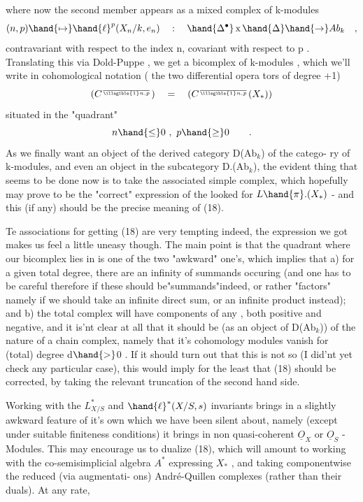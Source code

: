 
where now the second member appears as a mixed complex  of k-modules
\[ (n,p)\hand{\mapsto}\hand{\ell}^{p}(X_{n}/k,e_{n}) \quad : \quad \hand{\Delta^{\bullet}}\,\mathrm{x}\,\hand{\Delta}\hand{\to}Ab_{k} \quad , \]
contravariant with respect to the index n,  covariant with respect to
p .  Translating this via Dold-Puppe ,  we get a bicomplex of k-modules ,
which we'll write in cohomological notation ( the two  differential opera%
tors of degree +1)
\[ (C^{\over{\illegible{1}}{n,p}}) \quad = \quad (C^{\over{\illegible{1}}{n,p}}(X_{*})) \]
situated in the "quadrant"
\[ n \hand{\leq} 0 \ , \ p \hand{\geq} 0 \qquad . \]
As we finally want an object of the derived category D(Ab$_{k}$) of the catego-%
ry of k-modules,  and even an object in the subcategory D.(Ab$_{k}$),  the
evident thing that seems to be done now is to take the associated simple
complex,  which hopefully may prove to be the "correct" expression of the
looked for $L\hand{\pi}.(X_{*})$  -  and this (if any) should be the precise meaning of
(18).

Te associations for getting  (18) are very tempting
indeed,  the expression we got makes us feel a little uneasy though.  The
main point is that the quadrant where our bicomplex lies in is one of the
two "awkward" one's,  which implies that  a) for a given total degree,
there are an infinity of  summands occuring (and one has to be 
careful therefore if these should be"summands"indeed, or rather "factors"
namely if we should take an infinite direct sum, or an infinite product
instead);  and  b)  the total complex will have components of any ,
both positive and negative,  and it is'nt clear at all that it should be
(as an object of D(Ab$_{k}$)) of the nature of a chain complex,  namely that
it's cohomology modules vanish  for (total) degree d$\hand{>}$0 .   If
it should turn out that this is not so (I did'nt yet check any particular
case),  this would imply for the least that (18) should be corrected,  by
taking the relevant truncation of the second hand side.

Working with the $L^{*}_{X/S}$  and $\hand{\ell}^{*}(X/S,s)$  invariants brings in a
slightly awkward feature of it's own which we have been silent about,
namely (except under suitable finiteness conditions) it brings in non
quasi-coherent $\underline{O}_{X}$ or $\underline{O}_{S}$ - Modules.  This may encourage us to dualize
(18),  which will amount to working with the co-semisimplicial algebra
$A^{*}$ expressing $X_{*}$ ,  and taking componentwise the reduced (via augmentati-%
ons)  André-Quillen complexes (rather than their duals).  At any rate,

